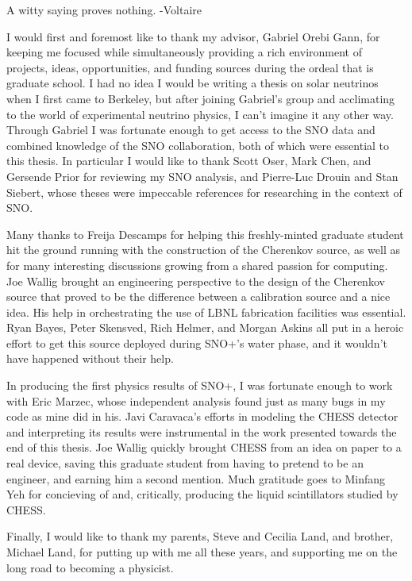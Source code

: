 \documentclass[12pt,letterpaper,oldfontcommands]{ucbthesis}
\begin{document}
\begin{frontmatter}

\begin{dedication}
\null\vfil
\begin{center}
A witty saying proves nothing. -Voltaire
\end{center}
\vfil\null
\end{dedication}

\tableofcontents
\clearpage
\listoffigures
\clearpage
\listoftables

\begin{acknowledgements}

I would first and foremost like to thank my advisor, Gabriel Orebi Gann, for keeping me focused while simultaneously providing a rich environment of projects, ideas, opportunities, and funding sources during the ordeal that is graduate school. 
I had no idea I would be writing a thesis on solar neutrinos when I first came to Berkeley, but after joining Gabriel's group and acclimating to the world of experimental neutrino physics, I can't imagine it any other way.
Through Gabriel I was fortunate enough to get access to the SNO data and combined knowledge of the SNO collaboration, both of which were essential to this thesis.
In particular I would like to thank Scott Oser, Mark Chen, and Gersende Prior for reviewing my SNO analysis, and Pierre-Luc Drouin and Stan Siebert, whose theses were impeccable references for researching in the context of SNO.

Many thanks to Freija Descamps for helping this freshly-minted graduate student hit the ground running with the construction of the Cherenkov source, as well as for many interesting discussions growing from a shared passion for computing.
Joe Wallig brought an engineering perspective to the design of the Cherenkov source that proved to be the difference between a calibration source and a nice idea.
His help in orchestrating the use of LBNL fabrication facilities was essential.
Ryan Bayes, Peter Skensved, Rich Helmer, and Morgan Askins all put in a heroic effort to get this source deployed during SNO+'s water phase, and it wouldn't have happened without their help.

In producing the first physics results of SNO+, I was fortunate enough to work with Eric Marzec, whose independent analysis found just as many bugs in my code as mine did in his.
Javi Caravaca's efforts in modeling the CHESS detector and interpreting its results were instrumental in the work presented towards the end of this thesis.
Joe Wallig quickly brought CHESS from an idea on paper to a real device, saving this graduate student from having to pretend to be an engineer, and earning him a second mention.
Much gratitude goes to Minfang Yeh for concieving of and, critically, producing the liquid scintillators studied by CHESS. 

Finally, I would like to thank my parents, Steve and Cecilia Land, and brother, Michael Land, for putting up with me all these years, and supporting me on the long road to becoming a physicist.

\end{acknowledgements}

\end{frontmatter}
\end{document}
